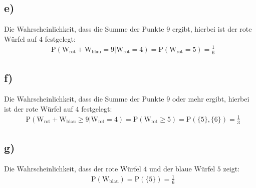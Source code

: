 \subsection{e)}
Die Wahrscheinlichkeit, dass die Summe der Punkte $9$ ergibt, hierbei ist der rote Würfel auf $4$ festgelegt:
\begin{align*}
&\mathrm{P}(\mathrm{W_{rot}}+\mathrm{W_{blau}}=9|\mathrm{W_{rot}}=4)=\mathrm{P}(\mathrm{W_{rot}}=5)=\frac{1}{6}
\end{align*}
\subsection{f)}
Die Wahrscheinlichkeit, dass die Summe der Punkte $9$ oder mehr ergibt, hierbei ist der rote Würfel auf $4$ festgelegt:
\begin{align*}
&\mathrm{P}(\mathrm{W_{rot}}+\mathrm{W_{blau}}\geqslant9|\mathrm{W_{rot}}=4)=\mathrm{P}(\mathrm{W_{rot}}\geqslant5)=\mathrm{P}(\{5\},\{6\})=\frac{1}{3}
\end{align*}
\subsection{g)}
Die Wahrscheinlichkeit, dass der rote Würfel $4$ und der blaue Würfel $5$ zeigt:
\begin{align*}
&\mathrm{P}(\mathrm{W_{blau}})=\mathrm{P}(\{5\})=\frac{1}{6}
\end{align*}
